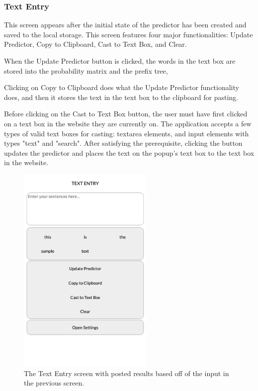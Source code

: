 \documentclass[journal]{./IEEE/IEEEtran}
\begin{document}
\subsubsection{Text Entry}
This screen appears after the initial state of the predictor has been created and saved to the local storage. This screen features four major functionalities: Update Predictor, Copy to Clipboard, Cast to Text Box, and Clear.

When the Update Predictor button is clicked, the words in the text box are stored into the probability matrix and the prefix tree,

Clicking on Copy to Clipboard does what the Update Predictor functionality does, and then it stores the text in the text box to the clipboard for pasting.

Before clicking on the Cast to Text Box button, the user must have first clicked on a text box in the website they are currently on. The application accepts a few types of valid text boxes for casting: textarea elements, and input elements with types "text" and "search". After satisfying the prerequisite, clicking the button updates the predictor and places the text on the popup's text box to the text box in the website.

\begin{figure}[!ht]
\begin{center}

\includegraphics[width=65mm]{images/initial-text-entry.png}
\caption{The Text Entry screen with posted results based off of the input in the previous screen.}

\end{center}
\end{figure}
\end{document}
